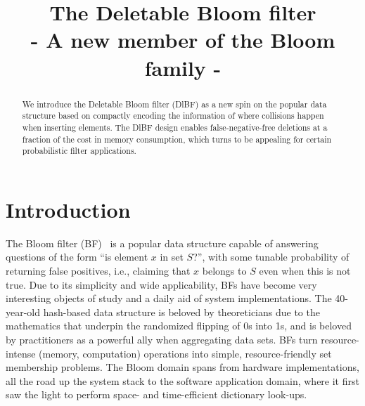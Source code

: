 \documentclass[conference]{IEEEtran}
\begin{document}
\title{The Deletable Bloom filter \\ - A new member of the Bloom family -}


\author{
}



\maketitle





\begin{abstract}
We introduce the Deletable Bloom filter (DlBF) as a new spin on the popular  data structure based on compactly encoding the information of where collisions happen when inserting elements. The DlBF design enables false-negative-free deletions at a fraction of the cost in memory consumption, which turns to be appealing for certain probabilistic filter applications. \end{abstract}







\IEEEpeerreviewmaketitle

\section{Introduction}
The Bloom filter (BF)~\cite{362692} is a popular data structure capable 
of answering questions of the form ``is element $x$ in set $S$?'', with some tunable probability of returning false positives, i.e., claiming that $x$ belongs to $S$ even when this is not true.
Due to its simplicity and wide applicability, BFs have become very interesting objects of study and a daily aid of system implementations.
The 40-year-old hash-based data structure is beloved by theoreticians due to the mathematics that underpin the randomized flipping of 0s into 1s, and is beloved by practitioners as a powerful ally when aggregating data sets. 
BFs turn resource-intense (memory, computation) operations into simple, resource-friendly set membership problems.
The Bloom domain spans from hardware implementations, 
all the road up the system stack to the software application domain, where it first saw the light
to perform space- and time-efficient dictionary look-ups.
\end{document}
